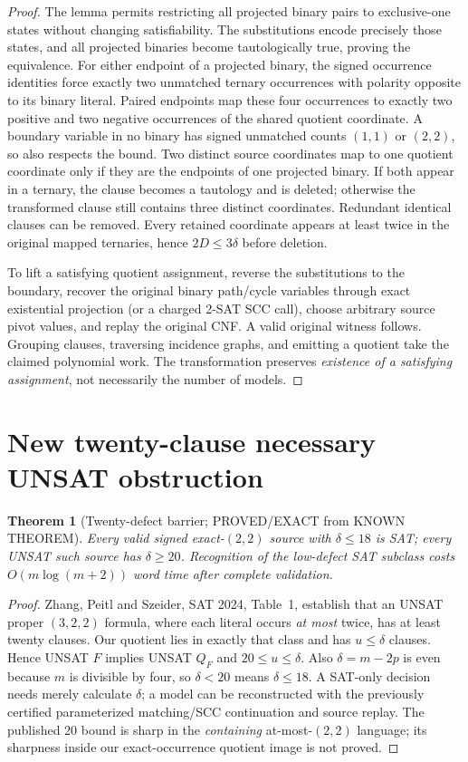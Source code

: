 \documentclass[11pt]{article}
\newtheorem{theorem}{Theorem}
\begin{document}
\begin{proof}
The lemma permits restricting all projected binary pairs to exclusive-one states without changing satisfiability. The substitutions encode precisely those states, and all projected binaries become tautologically true, proving the equivalence. For either endpoint of a projected binary, the signed occurrence identities force exactly two unmatched ternary occurrences with polarity opposite to its binary literal. Paired endpoints map these four occurrences to exactly two positive and two negative occurrences of the shared quotient coordinate. A boundary variable in no binary has signed unmatched counts $(1,1)$ or $(2,2)$, so also respects the bound. Two distinct source coordinates map to one quotient coordinate only if they are the endpoints of one projected binary. If both appear in a ternary, the clause becomes a tautology and is deleted; otherwise the transformed clause still contains three distinct coordinates. Redundant identical clauses can be removed. Every retained coordinate appears at least twice in the original mapped ternaries, hence $2D\le3\delta$ before deletion.

To lift a satisfying quotient assignment, reverse the substitutions to the boundary, recover the original binary path/cycle variables through exact existential projection (or a charged 2-SAT SCC call), choose arbitrary source pivot values, and replay the original CNF. A valid original witness follows. Grouping clauses, traversing incidence graphs, and emitting a quotient take the claimed polynomial work. The transformation preserves \emph{existence of a satisfying assignment}, not necessarily the number of models.
\end{proof}
\section{New twenty-clause necessary UNSAT obstruction}
\begin{theorem}[Twenty-defect barrier; PROVED/EXACT from KNOWN THEOREM]
Every valid signed exact-$(2,2)$ source with $\delta\le18$ is SAT; every UNSAT such source has $\delta\ge20$. Recognition of the low-defect SAT subclass costs $O(m\log(m+2))$ word time after complete validation.
\end{theorem}
\begin{proof}
Zhang, Peitl and Szeider, SAT 2024, Table~1, establish that an UNSAT proper $(3,2,2)$ formula, where each literal occurs \emph{at most} twice, has at least twenty clauses. Our quotient lies in exactly that class and has $u\le\delta$ clauses. Hence UNSAT $F$ implies UNSAT $Q_F$ and $20\le u\le\delta$. Also $\delta=m-2p$ is even because $m$ is divisible by four, so $\delta<20$ means $\delta\le18$. A SAT-only decision needs merely calculate $\delta$; a model can be reconstructed with the previously certified parameterized matching/SCC continuation and source replay. The published 20 bound is sharp in the \emph{containing} at-most-$(2,2)$ language; its sharpness inside our exact-occurrence quotient image is not proved.
\end{proof}
\end{document}
